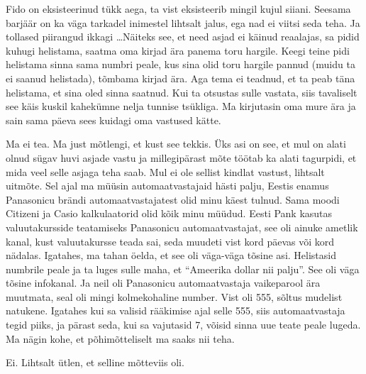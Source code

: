 
Fido on eksisteerinud  tükk aega, ta vist eksisteerib mingil kujul siiani. 
Seesama barjäär on ka väga tarkadel inimestel lihtsalt jalus, ega nad ei viitsi 
seda teha. Ja tollased piirangud ikkagi \ldots Näiteks see, et need asjad ei 
käinud reaalajas, sa pidid kuhugi helistama, saatma oma kirjad ära panema toru 
hargile. Keegi teine pidi helistama sinna sama numbri peale, kus sina olid toru 
hargile pannud (muidu ta ei saanud helistada), tõmbama kirjad ära. Aga tema ei 
teadnud, et ta peab täna helistama, et sina oled sinna saatnud. Kui ta otsustas 
sulle vastata, siis tavaliselt see käis kuskil kahekümne nelja tunnise 
tsükliga. Ma kirjutasin oma mure ära ja sain sama päeva sees kuidagi oma 
vastused kätte. 


Ma ei tea. Ma just mõtlengi, et kust see tekkis. Üks asi on see, et mul on 
alati olnud sügav huvi asjade vastu ja millegipärast mõte töötab ka alati 
tagurpidi, et mida veel selle asjaga teha saab. Mul ei ole sellist kindlat 
vastust, lihtsalt uitmõte. Sel ajal ma müüsin automaatvastajaid hästi palju, 
Eestis enamus Panasonicu brändi automaatvastajatest olid minu käest tulnud. 
Sama moodi Citizeni ja Casio kalkulaatorid olid kõik minu müüdud. Eesti 
Pank kasutas valuutakursside teatamiseks Panasonicu 
automaatvastajat, see oli ainuke ametlik kanal, kust valuutakursse teada sai, 
seda muudeti vist kord päevas või kord nädalas. Igatahes, ma tahan öelda, et 
see oli väga-väga tõsine asi. Helistasid numbrile peale ja ta luges sulle maha, 
et \enquote{Ameerika dollar nii palju}. See oli väga tõsine infokanal. Ja  neil 
oli Panasonicu automaatvastaja vaikeparool ära muutmata, seal oli mingi 
kolmekohaline number. Vist oli 555, sõltus mudelist natukene. Igatahes kui sa 
valisid rääkimise ajal selle 555, siis  automaatvastaja tegid piiks, ja pärast 
seda, kui sa vajutasid 7, võisid sinna uue teate peale lugeda. Ma nägin kohe, 
et põhimõtteliselt ma saaks nii teha. 


Ei. Lihtsalt ütlen, et selline mõtteviis oli. 


